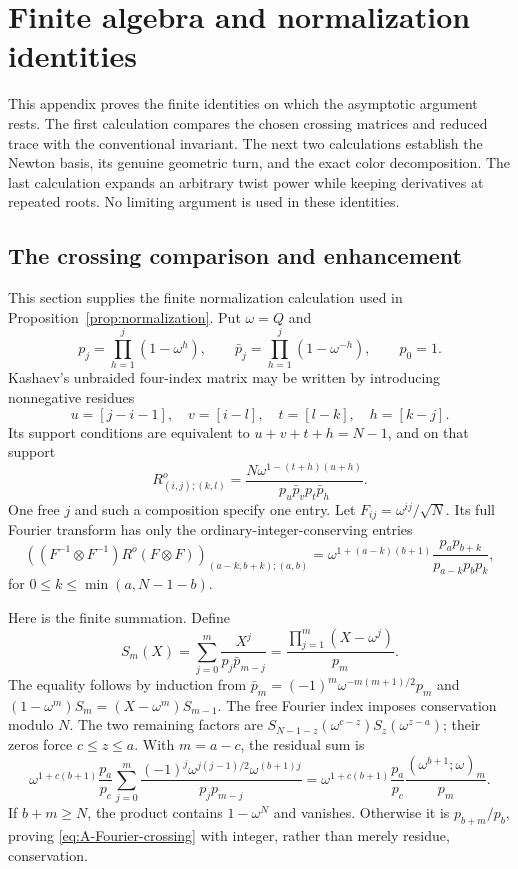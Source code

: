 \chapter{Finite algebra and normalization identities}\label{app:finite}

This appendix proves the finite identities on which the asymptotic argument rests. The first calculation compares the chosen crossing matrices and reduced trace with the conventional invariant. The next two calculations establish the Newton basis, its genuine geometric turn, and the exact color decomposition. The last calculation expands an arbitrary twist power while keeping derivatives at repeated roots. No limiting argument is used in these identities.

\section{The crossing comparison and enhancement}\label{app:normalization}
This section supplies the finite normalization calculation used in Proposition~\ref{prop:normalization}. Put $\omega=Q$ and
\[
 p_j=\prod_{h=1}^{j}(1-\omega^h),\qquad
 \bar p_j=\prod_{h=1}^{j}(1-\omega^{-h}),\qquad p_0=1.
\]
Kashaev's unbraided four-index matrix may be written by introducing nonnegative residues
\[
 u=[j-i-1],\quad v=[i-l],\quad t=[l-k],\quad h=[k-j].
\]
Its support conditions are equivalent to $u+v+t+h=N-1$, and on that support
\begin{equation}\label{eq:A-original-crossing}
 R^o_{(i,j);(k,l)}=
 \frac{N\omega^{1-(t+h)(u+h)}}{p_u\bar p_vp_t\bar p_h}.
\end{equation}
One free $j$ and such a composition specify one entry. Let $F_{ij}=\omega^{ij}/\sqrt N$. Its full Fourier transform has only the ordinary-integer-conserving entries
\begin{equation}\label{eq:A-Fourier-crossing}
 ((F^{-1}\otimes F^{-1})R^o(F\otimes F))_{(a-k,b+k);(a,b)}
 =\omega^{1+(a-k)(b+1)}\frac{p_ap_{b+k}}{p_{a-k}p_bp_k},
\end{equation}
for $0\le k\le\min(a,N-1-b)$.

Here is the finite summation. Define
\[
 S_m(X)=\sum_{j=0}^m\frac{X^j}{p_j\bar p_{m-j}}
 =\frac{\prod_{j=1}^m(X-\omega^j)}{p_m}.
\]
The equality follows by induction from $\bar p_m=(-1)^m\omega^{-m(m+1)/2}p_m$ and
$(1-\omega^m)S_m=(X-\omega^m)S_{m-1}$. The free Fourier index imposes conservation modulo $N$. The two remaining factors are
$S_{N-1-z}(\omega^{c-z})S_z(\omega^{z-a})$; their zeros force $c\le z\le a$. With $m=a-c$, the residual sum is
\[
 \omega^{1+c(b+1)}\frac{p_a}{p_c}
 \sum_{j=0}^m\frac{(-1)^j\omega^{j(j-1)/2}\omega^{(b+1)j}}
 {p_jp_{m-j}}
 =\omega^{1+c(b+1)}\frac{p_a}{p_c}
 \frac{(\omega^{b+1};\omega)_m}{p_m}.
\]
If $b+m\ge N$, the product contains $1-\omega^N$ and vanishes. Otherwise it is $p_{b+m}/p_b$, proving \eqref{eq:A-Fourier-crossing} with integer, rather than merely residue, conservation.

